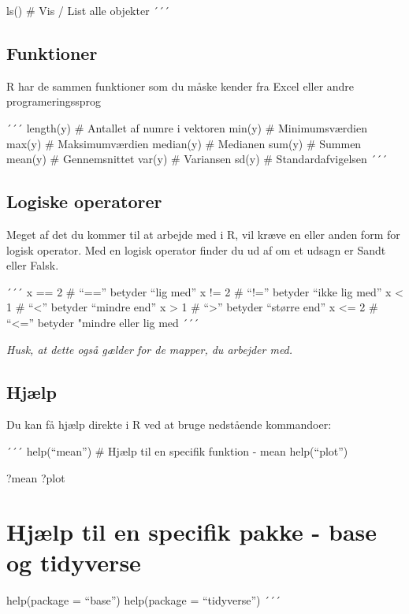 \documentclass[
]{book}
\begin{document}
ls() \# Vis / List alle objekter
´´´

\hypertarget{funktioner}{%
\section{Funktioner}\label{funktioner}}

R har de sammen funktioner som du måske kender fra Excel eller andre programeringssprog

´´´
length(y) \# Antallet af numre i vektoren
min(y) \# Minimumsværdien
max(y) \# Maksimumværdien
median(y) \# Medianen
sum(y) \# Summen
mean(y) \# Gennemsnittet
var(y) \# Variansen
sd(y) \# Standardafvigelsen
´´´

\hypertarget{logiske-operatorer}{%
\section{Logiske operatorer}\label{logiske-operatorer}}

Meget af det du kommer til at arbejde med i R, vil kræve en eller anden form for logisk operator. Med en logisk operator finder du ud af om et udsagn er Sandt eller Falsk.

´´´
x == 2 \# ``=='' betyder ``lig med''
x != 2 \# ``!='' betyder ``ikke lig med''
x \textless{} 1 \# ``\textless{}'' betyder ``mindre end''
x \textgreater{} 1 \# ``\textgreater{}'' betyder ``større end''
x \textless= 2 \# ``\textless='' betyder "mindre eller lig med
´´´

\emph{Husk, at dette også gælder for de mapper, du arbejder med.}

\hypertarget{hjuxe6lp}{%
\section{Hjælp}\label{hjuxe6lp}}

Du kan få hjælp direkte i R ved at bruge nedstående kommandoer:

´´´
help(``mean'') \# Hjælp til en specifik funktion - mean
help(``plot'')

?mean
?plot

\hypertarget{hjuxe6lp-til-en-specifik-pakke---base-og-tidyverse}{%
\chapter{Hjælp til en specifik pakke - base og tidyverse}\label{hjuxe6lp-til-en-specifik-pakke---base-og-tidyverse}}

help(package = ``base'')
help(package = ``tidyverse'')
´´´
\end{document}
